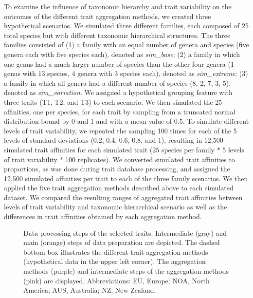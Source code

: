 \documentclass{article}
\begin{document}
To examine the influence of taxonomic hierarchy and trait variability on the outcomes of the different trait aggregation methods, we created three hypothetical scenarios. We simulated three different families, each composed of 25 total species but with different taxonomic hierarchical structures.  The three families consisted of (1) a family with an equal number of genera and species (five genera each with five species each), denoted as \textit{sim\_base}; (2) a family in which one genus had a much larger number of species than the other four genera (1 genus with 13 species, 4 genera with 3 species each), denoted as \textit{sim\_extreme}; (3) a family in which all genera had a different number of species (8, 2, 7, 3, 5), denoted as \textit{sim\_variation}. We assigned a hypothetical grouping feature with three traits (T1, T2, and T3) to each scenario. We then simulated the 25 affinities, one per species, for each trait by sampling from a truncated normal distribution bound by 0 and 1 and with a mean value of 0.5. To simulate different levels of trait variability, we repeated the sampling 100 times for each of the 5 levels of standard deviations (0.2, 0.4, 0.6, 0.8, and 1), resulting in 12,500 simulated trait affinities for each simulated trait ($25$ species per family $*$ 5 levels of trait variability $*$ 100 replicates). We converted simulated trait affinities to proportions, as was done during trait database processing, and assigned the 12,500 simulated affinities per trait to each of the three family scenarios. We then applied the five trait aggregation methods described above to each simulated dataset. We compared the resulting ranges of aggregated trait affinities between levels of trait variability and taxonomic hierarchical scenario as well as the differences in trait affinities obtained by each aggregation method.

\begin{figure}
  \centering
  
  \caption{Data processing steps of the selected traits. Intermediate (gray) and main (orange) steps of data preparation are depicted. The dashed bottom box illustrates the different trait aggregation methods (hypothetical data in the upper left corner). The aggregation methods (purple) and intermediate steps of the aggregation methods (pink) are displayed. Abbreviations: EU, Europe; NOA, North America; AUS, Australia; NZ, New Zealand.}
  \label{fig:data_proc_overview}
\end{figure}

\end{document}
